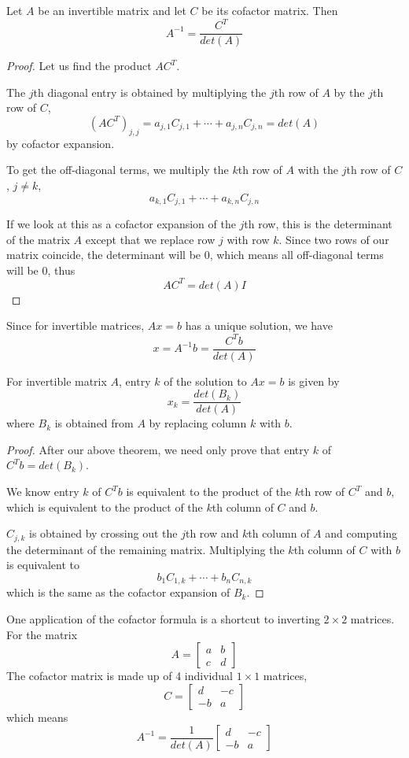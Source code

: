 \begin{theorem}
Let $A$ be an invertible matrix and let $C$ be its cofactor matrix. Then 
$$A^{-1} = \frac{C^{T}}{det(A)}$$
\end{theorem}

\begin{proof}
Let us find the product $AC^{T}$. 

The $j$th diagonal entry is obtained by multiplying the $j$th row of $A$ by the $j$th row of $C$,
$$(AC^{T})_{j, j} = a_{j, 1} C_{j, 1} + \cdots + a_{j, n} C_{j, n} = det(A)$$
by cofactor expansion. 

To get the off-diagonal terms, we multiply the $k$th row of $A$ with the $j$th row of $C$, $j \neq k$, 
$$a_{k, 1} C_{j, 1} + \cdots + a_{k, n} C_{j, n}$$

If we look at this as a cofactor expansion of the $j$th row, this is the determinant of the matrix $A$ except that we replace row $j$ with row $k$. Since two rows of our matrix coincide, the determinant will be 0, which means all off-diagonal terms will be 0, thus 
$$AC^{T} = det(A) I$$
\end{proof}

Since for invertible matrices, $Ax = b$ has a unique solution, we have 
$$x = A^{-1} b = \frac{C^{T}b}{det(A)}$$

\begin{theorem}
For invertible matrix $A$, entry $k$ of the solution to $Ax = b$ is given by 
$$x_{k} = \frac{det(B_{k})}{det(A)} $$
where $B_{k}$ is obtained from $A$ by replacing column $k$ with $b$. 
\end{theorem}

\begin{proof}
After our above theorem, we need only prove that entry $k$ of $C^{T}b = det(B_{k})$. 

We know entry $k$ of $C^{T} b$ is equivalent to the product of the $k$th row of $C^{T}$ and $b$, which is equivalent to the product of the $k$th column of $C$ and $b$. 

$C_{j,k}$ is obtained by crossing out the $j$th row and $k$th column of $A$ and computing the determinant of the remaining matrix. Multiplying the $k$th column of $C$ with $b$ is equivalent to 
$$b_{1} C_{1, k} + \cdots + b_{n} C_{n, k}$$ 
which is the same as the cofactor expansion of $B_{k}$. 
\end{proof}

One application of the cofactor formula is a shortcut to inverting $2 \times 2$ matrices. 
For the matrix 
$$A = \begin{bmatrix}
a & b \\
c & d
\end{bmatrix}$$
The cofactor matrix is made up of 4 individual $1 \times 1$ matrices,
$$C = \begin{bmatrix}
d & -c \\
-b & a
\end{bmatrix}$$
which means 
$$A^{-1} = \frac{1}{det(A)} \begin{bmatrix}
d & -c \\
-b & a
\end{bmatrix}$$


